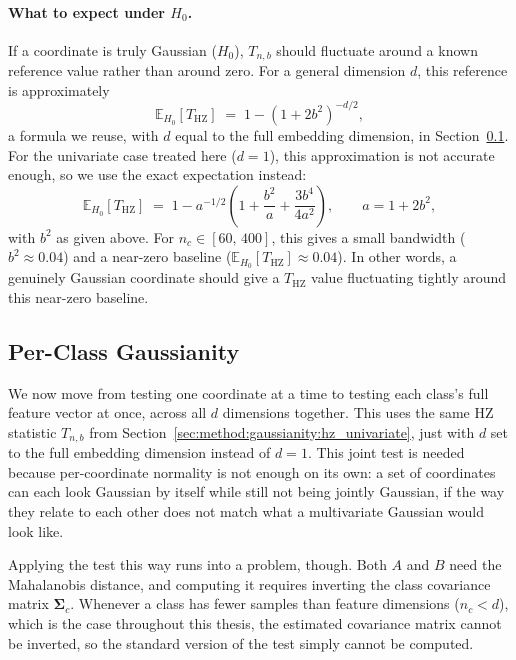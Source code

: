 \paragraph{What to expect under $H_0$.}
If a coordinate is truly Gaussian ($H_0$), $T_{n,b}$ should fluctuate around a known reference value rather than around zero. For a general dimension $d$, this reference is approximately
\begin{equation}
	\mathbb{E}_{H_0}[T_{\mathrm{HZ}}] \;=\; 1 - (1 + 2b^2)^{-d/2},
	\label{eq:hz_expected_general}
\end{equation}
a formula we reuse, with $d$ equal to the full embedding dimension, in Section~\ref{sec:method:gaussianity:multivariate}. For the univariate case treated here ($d=1$), this approximation is not accurate enough, so we use the exact expectation instead:
\begin{equation}
	\mathbb{E}_{H_0}[T_{\mathrm{HZ}}] \;=\; 1 - a^{-1/2}\left(1 + \frac{b^2}{a} + \frac{3b^4}{4a^2}\right), \qquad a = 1+2b^2,
	\label{eq:hz_expected_univariate}
\end{equation}
with $b^2$ as given above. For $n_c \in [60,\,400]$, this gives a small bandwidth ($b^2 \approx 0.04$) and a near-zero baseline ($\mathbb{E}_{H_0}[T_{\mathrm{HZ}}] \approx 0.04$). In other words, a genuinely Gaussian coordinate should give a $T_{\mathrm{HZ}}$ value fluctuating tightly around this near-zero baseline.

\subsection{Per-Class Gaussianity}
\label{sec:method:gaussianity:multivariate}

We now move from testing one coordinate at a time to testing each class's full feature vector at once, across all $d$ dimensions together. This uses the same HZ statistic $T_{n,b}$ from Section~\ref{sec:method:gaussianity:hz_univariate}, just with $d$ set to the full embedding dimension instead of $d=1$. This joint test is needed because per-coordinate normality is not enough on its own: a set of coordinates can each look Gaussian by itself while still not being jointly Gaussian, if the way they relate to each other does not match what a multivariate Gaussian would look like.

Applying the test this way runs into a problem, though. Both $A$ and $B$ need the Mahalanobis distance, and computing it requires inverting the class covariance matrix $\boldsymbol{\Sigma}_c$. Whenever a class has fewer samples than feature dimensions ($n_c < d$), which is the case throughout this thesis, the estimated covariance matrix cannot be inverted, so the standard version of the test simply cannot be computed.

